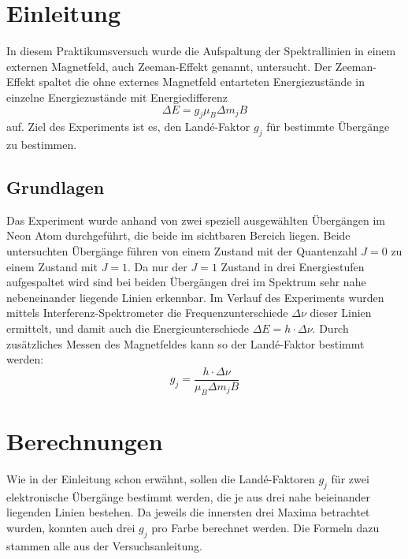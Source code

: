 \documentclass[a4paper,parskip,11pt, DIV12]{scrreprt}
\begin{document}
	
	
		\chapter{Einleitung}
	
	In diesem Praktikumsversuch wurde die Aufspaltung der Spektrallinien in einem externen Magnetfeld, auch Zeeman-Effekt genannt, untersucht. Der Zeeman-Effekt spaltet die ohne externes Magnetfeld entarteten Energiezustände in einzelne Energiezustände mit Energiedifferenz
	\begin{equation}
	\label{Energiedifferenz}
	\Delta E = g_j \mu_B \Delta m_j B 
	\end{equation}
auf. Ziel des Experiments ist es, den Landé-Faktor $g_j $ für bestimmte Übergänge zu bestimmen. 
	\section{Grundlagen}
	Das Experiment wurde anhand von zwei speziell ausgewählten Übergängen im Neon Atom durchgeführt, die beide im sichtbaren Bereich liegen. Beide untersuchten Übergänge führen von einem Zustand mit der Quantenzahl $ J = 0 $ zu einem Zustand mit $J = 1$. Da nur der $J = 1$ Zustand in drei Energiestufen aufgespaltet wird sind bei beiden Übergängen drei im Spektrum sehr nahe nebeneinander liegende Linien erkennbar. Im Verlauf des Experiments wurden mittels Interferenz-Spektrometer die Frequenzunterschiede $\Delta \nu$  dieser Linien ermittelt, und damit auch die Energieunterschiede $\Delta E = h \cdot \Delta \nu$. Durch zusätzliches Messen des Magnetfeldes kann so der Landé-Faktor bestimmt werden:
	\begin{equation}
	\label{Landé-Faktor}
	g_j = \frac{h \cdot \Delta \nu}{\mu_B \Delta m_j B}
	\end{equation}
	
	
	\chapter{Berechnungen}
	
	Wie in der Einleitung schon erwähnt, sollen die Landé-Faktoren $g_j$ für zwei elektronische Übergänge bestimmt werden, die je aus drei nahe beieinander liegenden Linien bestehen. Da jeweils die innersten drei Maxima betrachtet wurden, konnten auch drei $g_j$ pro Farbe berechnet werden. Die Formeln dazu stammen alle aus der Versuchsanleitung. 
	
\end{document}
